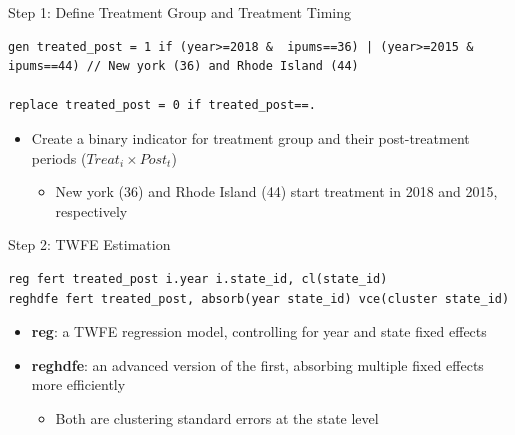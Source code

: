 \documentclass[dvipsnames,hyperref={pdfpagelabels=false}]{beamer}
\begin{document}
\begin{frame}[fragile]{Step 1: Define Treatment Group and Treatment Timing}{}
\begin{lstlisting}
gen treated_post = 1 if (year>=2018 &  ipums==36) | (year>=2015 &  ipums==44) // New york (36) and Rhode Island (44)

replace treated_post = 0 if treated_post==.
\end{lstlisting}	
	
	
\begin{itemize}
	\vspace{0.2cm}
	\item Create a binary indicator for treatment group and their post-treatment periods ($Treat_{i} \times Post_{t}$)
	\vspace{0.2cm}
	\begin{itemize}
		\item New york (36) and Rhode Island (44) start treatment in 2018 and 2015, respectively
	\end{itemize}
\end{itemize}
	
	
	
	
\end{frame}



\begin{frame}[fragile]{Step 2: TWFE Estimation}{}
\begin{lstlisting}
reg fert treated_post i.year i.state_id, cl(state_id)
reghdfe fert treated_post, absorb(year state_id) vce(cluster state_id)
\end{lstlisting}	
	
	
	\begin{itemize}
		
		\item \textbf{reg}: a TWFE regression model, controlling for year and state fixed effects
		\vspace{0.2cm}
		\item \textbf{reghdfe}: an advanced version of the first, absorbing multiple fixed effects more efficiently
		\vspace{0.2cm}
		\begin{itemize}
			\item Both are clustering standard errors at the state level
		\end{itemize}
	\end{itemize}
	
	
	
	
\end{frame}
\end{document}
